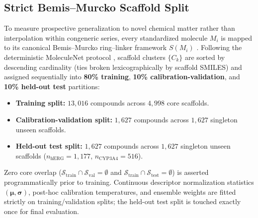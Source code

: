 \documentclass[10pt,twocolumn,letterpaper]{article}
\begin{document}
\subsection{Strict Bemis–Murcko Scaffold Split}
To measure prospective generalization to novel chemical matter rather than interpolation within congeneric series, every standardized molecule $M_i$ is mapped to its canonical Bemis–Murcko ring–linker framework $S(M_i)$ \citep{bemis1996properties}. Following the deterministic MoleculeNet protocol \citep{wu2018moleculenet}, scaffold clusters $\{C_k\}$ are sorted by descending cardinality (ties broken lexicographically by scaffold \textsc{SMILES}) and assigned sequentially into \textbf{80\% training}, \textbf{10\% calibration-validation}, and \textbf{10\% held-out test} partitions:
\begin{itemize}
  \item \textbf{Training split:} $13{,}016$ compounds across $4{,}998$ core scaffolds.
  \item \textbf{Calibration-validation split:} $1{,}627$ compounds across $1{,}627$ singleton unseen scaffolds.
  \item \textbf{Held-out test split:} $1{,}627$ compounds across $1{,}627$ singleton unseen scaffolds ($n_{\mathrm{hERG}} = 1{,}177$, $n_{\mathrm{CYP3A4}} = 516$).
\end{itemize}
Zero core overlap ($\mathcal{S}_{\mathrm{train}} \cap \mathcal{S}_{\mathrm{val}} = \emptyset$ and $\mathcal{S}_{\mathrm{train}} \cap \mathcal{S}_{\mathrm{test}} = \emptyset$) is asserted programmatically prior to training. Continuous descriptor normalization statistics $(\boldsymbol{\mu}, \boldsymbol{\sigma})$, post-hoc calibration temperatures, and ensemble weights are fitted strictly on training/validation splits; the held-out test split is touched exactly once for final evaluation.
\end{document}
